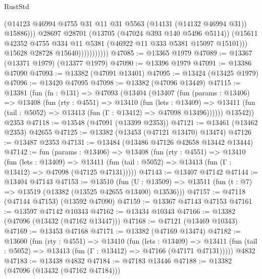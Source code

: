 \begin{lexlean}{RustStd}
\begin{coremodule}
                                (@14123
                                  @46994
                                  @4755
                                  @31
                                  @11
                                  @31
                                  @5563
                                  (@14131 (@14132 @46994 @31))
                                  @15886)))
                            @28697
                            @28701
                            (@13705 (@47024 @393 @140 @5496 @5114))
                            (@15611
                              @42352
                              @4755
                              @334
                              @11
                              @5381
                              (@46922 @11 @333 @5381 @15097 @15101)))
                          @15628
                          @28728
                          @15640)))))))))))
@47085 := @13365 @1979
@47089 := @13367 (@13371 @1979) (@13377 @1979)
@47090 := @13396 @1979
@47091 := @13386 @47090
@47093 := @13382 (@47091 @13401)
@47095 := @13424 (@13425 @1979)
@47096 := @13420 @47095
@47098 := @13382 (@47096 @13449)
@47115 := @13381
    (fun (fn : @131) =>
    @47093
      (@13404
        (@13407
          (fun (params : @13406) =>
          @13408
            (fun (rty : @4551) =>
            @13410
              (fun (lets : @13409) =>
              @13411 (fun (tail : @5052) => @13413 (fun (Γ : @13412) => @47098 @13496))))))
        @13542))
    @2353
@47118 := @13548 (@47091 (@13399 @2353))
@47121 := @13461 (@13462 @2353) @42655
@47125 := @13382 (@13453 (@47121 @13470) @13474)
@47126 := @13487 @2353
@47131 := @13484 (@13486 @47126 @42658 @13442 @13444)
@47142 := fun (params : @13406) =>
  @13408
    (fun (rty : @4551) =>
    @13410
      (fun (lets : @13409) =>
      @13411 (fun (tail : @5052) => @13413 (fun (Γ : @13412) => @47098 (@47125 @47131)))))
@47143 := @13407 @47142
@47144 := @13404 @47143
@47153 := @13510
    (fun (U : @13509) => @13511 (fun (t : @7) => @13519 (@13382 (@13525 @42655 @13400) @13536)))
@47157 := @47118 (@47144 @47153) (@13592 @47090)
@47159 := @13367 @47143 @47153
@47161 := @13597 @47142 @10343
@47162 := @13434 @10343
@47166 := @13382 (@47096 (@13432 (@47162 @13447)))
@47168 := @47121 (@13469 @10343)
@47169 := @13453 @47168
@47171 := @13382 (@47169 @13474)
@47182 := @13600
    (fun (rty : @4551) =>
    @13410
      (fun (lets : @13409) =>
      @13411 (fun (tail : @5052) => @13413 (fun (Γ : @13412) => @47166 (@47171 @47131)))))
    @4832
@47183 := @13438 @4832
@47184 := @47183 @13446
@47188 := @13382 (@47096 (@13432 (@47162 @47184)))

\end{coremodule}
\end{lexlean}
